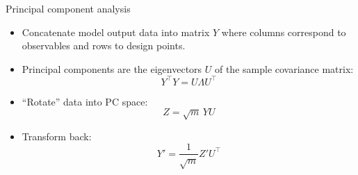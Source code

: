 \documentclass{beamer}
\newcommand{\tran}{^\intercal}
\begin{document}
\begin{frame}{Principal component analysis}
  \begin{itemize}
    \item Concatenate model output data into matrix $Y$ where columns correspond to observables and rows to design points.
    \item Principal components are the eigenvectors $U$ of the sample covariance matrix:
      \begin{equation*}
        Y\tran Y = U \Lambda U\tran
      \end{equation*}
    \item ``Rotate'' data into PC space:
      \begin{equation*}
        Z = \sqrt m \, YU
      \end{equation*}
    \item Transform back:
      \begin{equation*}
        Y' = \frac{1}{\sqrt m} Z' U\tran
      \end{equation*}
  \end{itemize}
\end{frame}
\end{document}
